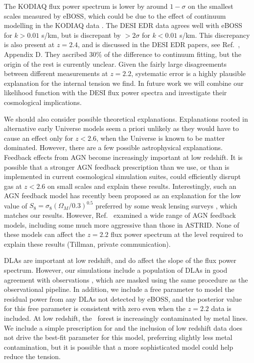 The KODIAQ flux power spectrum is lower by around $1-\sigma$ on the smallest scales measured by eBOSS, which could be due to the effect of continuum modelling in the KODIAQ data \cite{2022MNRAS.509.2842K}. The DESI EDR data agrees well with eBOSS for $k > 0.01$ s/km, but is discrepant by $> 2 \sigma$ for $k < 0.01$ s/km. This discrepancy is also present at $z=2.4$, and is discussed in the DESI EDR papers, see Ref.~\cite{2023arXiv230606311R}, Appendix D. They ascribed $30\%$ of the difference to continuum fitting, but the origin of the rest is currently unclear. Given the fairly large disagreements between different measurements at $z=2.2$, systematic error is a highly plausible explanation for the internal tension we find. In future work we will combine our likelihood function with the DESI flux power spectra and investigate their cosmological implications.

We should also consider possible theoretical explanations. Explanations rooted in alternative early Universe models seem a priori unlikely as they would have to cause an effect only for $z < 2.6$, when the Universe is known to be matter dominated. 
However, there are a few possible astrophysical explanations. Feedback effects from AGN become increasingly important at low redshift. It is possible that a stronger AGN feedback prescription than we use, or than is implemented in current cosmological simulation suites, could efficiently disrupt gas at $z < 2.6$ on small scales and explain these results. Interestingly, such an AGN feedback model has recently been proposed as an explanation for the low value of $S_8 = \sigma_8 (\Omega_M/0.3)^{0.5}$ preferred by some weak lensing surveys \cite{2022MNRAS.516.5355A}, which matches our results. However, Ref.~\cite{2023arXiv230706360T} examined a wide range of AGN feedback models, including some much more aggressive than those in ASTRID. None of these models can affect the $z=2.2$ flux power spectrum at the level required to explain these results (Tillman, private communication).

DLAs are important at low redshift, and do affect the slope of the flux power spectrum. However, our simulations include a population of DLAs in good agreement with observations \cite{2023simsuite}, which are masked using the same procedure as the observational pipeline. In addition, we include a free parameter to model the residual power from any DLAs not detected by eBOSS, and the posterior value for this free parameter is consistent with zero even when the $z=2.2$ data is included. At low redshift, the \Lya~forest is increasingly contaminated by metal lines. We include a simple prescription for  and the inclusion of low redshift data does not drive the best-fit parameter for this model, preferring slightly less metal contamination, but it is possible that a more sophisticated model could help reduce the tension.

